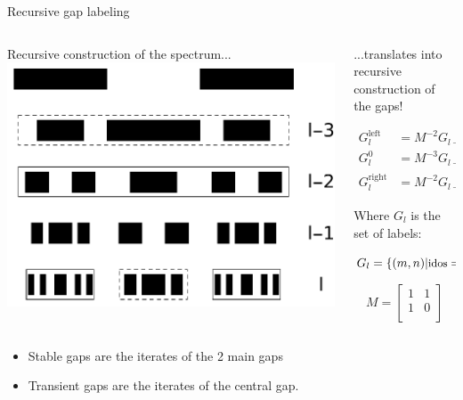 \documentclass[xcolor=x11names,compress,professionalfonts]{beamer}
\renewcommand{\(}{\begin{columns}}
\renewcommand{\)}{\end{columns}}
\newcommand{\<}[1]{\begin{column}{#1}}
\renewcommand{\>}{\end{column}}
\newcommand{\id}{\ensuremath{\text{idos}}}
\newcommand{\gv}{\ensuremath{\mathbf{g}}}
\newcommand{\sub}{\ensuremath{M}}
\begin{document}
\begin{frame}{Recursive gap labeling}

\begin{columns}
\newcommand{\s}{.2}

  \begin{column}{5cm}
  Recursive construction of the spectrum...
  \centering
     \includegraphics[scale=.35]{img/recursive_construction_spectrum.pdf}
  \end{column}


  \begin{column}{5cm}
  ...translates into recursive construction of the gaps!
  
		\begin{align*}
			G_{l}^{\text{left}} &= \sub^{-2} G_{l-2} \\
			G_{l}^0 &= \sub^{-3} G_{l-3} + \gv_1 \\
			G_{l}^\text{right} &= \sub^{-2} G_{l-2} + \gv_2
		\end{align*}

Where $G_l$ is the set of labels:

$\small{G_l = \{(m,n)| \id = n/(1+\alpha) + m\}}$

\[
			\sub = \begin{bmatrix}
				1 & 1\\
				1 & 0\\
			\end{bmatrix}
			\]
  \end{column}

\end{columns}


\begin{itemize}
	\item {\color{BostonBlue}Stable gaps} are the iterates of the 2 main gaps
	\item {\color{Complementary}Transient gaps} are the iterates of the central gap.
\end{itemize}

\end{frame}
\end{document}
